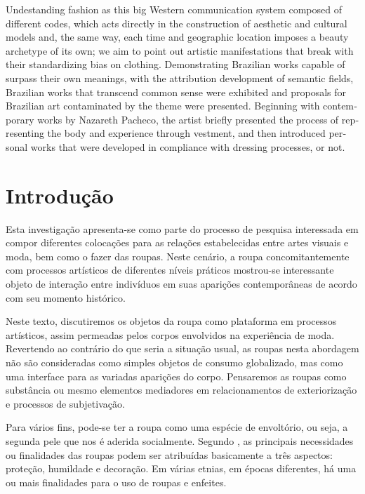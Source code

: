 \begin{refsection}
\begin{otherlanguage}{english}
    \begin{galoResumo}[Abstract]
        Undestanding fashion as this big Western communication system composed of different codes, which acts directly in the construction of aesthetic and cultural models and, the same way, each time and geographic location imposes a beauty archetype of its own; we aim to point out artistic manifestations that break with their standardizing bias on clothing. Demonstrating Brazilian works capable of surpass their own meanings, with the attribution development of semantic fields, Brazilian works that transcend common sense were exhibited and proposals for Brazilian art contaminated by the theme were presented. Beginning with contemporary works by Nazareth Pacheco, the artist briefly presented the process of representing the body and experience through vestment, and then introduced personal works that were developed in compliance with dressing processes, or not.
    \end{galoResumo}
    \mednobreak
    \end{otherlanguage}

    \section{Introdução}

    Esta investigação apresenta-se como parte do processo de pesquisa interessada em compor diferentes colocações para as relações estabelecidas entre artes visuais e moda, bem como o fazer das roupas. Neste cenário, a roupa concomitantemente com processos artísticos de diferentes níveis práticos mostrou-se interessante objeto de interação entre indivíduos em suas aparições contemporâneas de acordo com seu momento histórico. 

    Neste texto, discutiremos os objetos da roupa como plataforma em processos artísticos, assim permeadas pelos corpos envolvidos na experiência de moda. Revertendo ao contrário do que seria a situação usual, as roupas nesta abordagem não são consideradas como simples objetos de consumo globalizado, mas como uma interface para as variadas aparições do corpo. Pensaremos as roupas como substância ou mesmo elementos mediadores em relacionamentos de exteriorização e processos de subjetivação. 

    Para vários fins, pode-se ter a roupa como uma espécie de envoltório, ou seja, a segunda pele que nos é aderida socialmente. Segundo \textcite[p.~34]{Mendonca2006Reflexo}, as principais necessidades ou finalidades das roupas podem ser atribuídas basicamente a três aspectos: proteção, humildade e decoração. Em várias etnias, em épocas diferentes, há uma ou mais finalidades para o uso de roupas e enfeites. 


\end{refsection}
